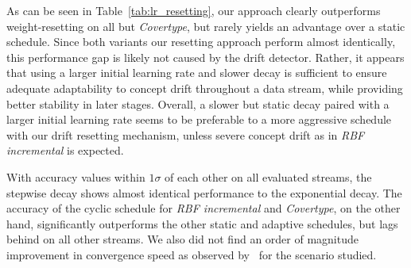 \documentclass{article} %
\begin{document}
As can be seen in Table~\ref{tab:lr_resetting}, our approach clearly outperforms weight-resetting on all but \textit{Covertype}, but rarely yields an advantage over a static schedule.
Since both variants our resetting approach perform almost identically, this performance gap is likely not caused by the drift detector.
Rather, it appears that using a larger initial learning rate and slower decay is sufficient to ensure adequate adaptability to concept drift throughout a data stream, while providing better stability in later stages.
Overall, a slower but static decay paired with a larger initial learning rate seems to be preferable to a more aggressive schedule with our drift resetting mechanism, unless severe concept drift as in \textit{RBF incremental} is expected.

With accuracy values within $1\sigma$ of each other on all evaluated streams, the stepwise decay shows almost identical performance to the exponential decay.
The accuracy of the cyclic schedule for \textit{RBF incremental} and \textit{Covertype}, on the other hand, significantly outperforms the other static and adaptive schedules, but lags behind on all other streams.
We also did not find an order of magnitude improvement in convergence speed as observed by~\citep{smithSuperConvergenceVeryFast2018a} for the scenario studied.
\end{document}
